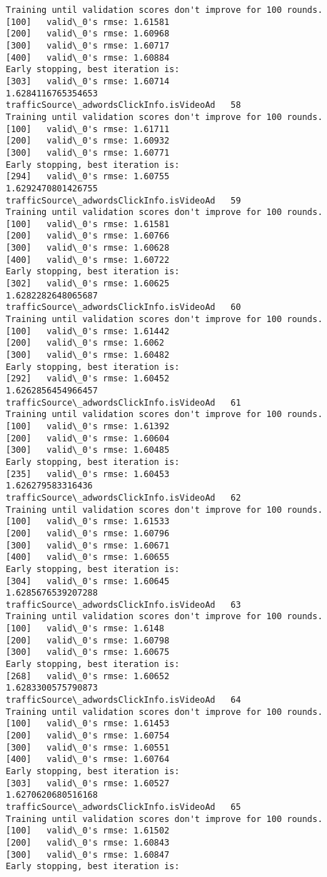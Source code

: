 \documentclass[11pt]{article}
\begin{document}
\begin{Verbatim}[commandchars=\\\{\}]
Training until validation scores don't improve for 100 rounds.
[100]	valid\_0's rmse: 1.61581
[200]	valid\_0's rmse: 1.60968
[300]	valid\_0's rmse: 1.60717
[400]	valid\_0's rmse: 1.60884
Early stopping, best iteration is:
[303]	valid\_0's rmse: 1.60714
1.6284116765354653
trafficSource\_adwordsClickInfo.isVideoAd   58
Training until validation scores don't improve for 100 rounds.
[100]	valid\_0's rmse: 1.61711
[200]	valid\_0's rmse: 1.60932
[300]	valid\_0's rmse: 1.60771
Early stopping, best iteration is:
[294]	valid\_0's rmse: 1.60755
1.6292470801426755
trafficSource\_adwordsClickInfo.isVideoAd   59
Training until validation scores don't improve for 100 rounds.
[100]	valid\_0's rmse: 1.61581
[200]	valid\_0's rmse: 1.60766
[300]	valid\_0's rmse: 1.60628
[400]	valid\_0's rmse: 1.60722
Early stopping, best iteration is:
[302]	valid\_0's rmse: 1.60625
1.6282282648065687
trafficSource\_adwordsClickInfo.isVideoAd   60
Training until validation scores don't improve for 100 rounds.
[100]	valid\_0's rmse: 1.61442
[200]	valid\_0's rmse: 1.6062
[300]	valid\_0's rmse: 1.60482
Early stopping, best iteration is:
[292]	valid\_0's rmse: 1.60452
1.6262856454966457
trafficSource\_adwordsClickInfo.isVideoAd   61
Training until validation scores don't improve for 100 rounds.
[100]	valid\_0's rmse: 1.61392
[200]	valid\_0's rmse: 1.60604
[300]	valid\_0's rmse: 1.60485
Early stopping, best iteration is:
[235]	valid\_0's rmse: 1.60453
1.626279583316436
trafficSource\_adwordsClickInfo.isVideoAd   62
Training until validation scores don't improve for 100 rounds.
[100]	valid\_0's rmse: 1.61533
[200]	valid\_0's rmse: 1.60796
[300]	valid\_0's rmse: 1.60671
[400]	valid\_0's rmse: 1.60655
Early stopping, best iteration is:
[304]	valid\_0's rmse: 1.60645
1.6285676539207288
trafficSource\_adwordsClickInfo.isVideoAd   63
Training until validation scores don't improve for 100 rounds.
[100]	valid\_0's rmse: 1.6148
[200]	valid\_0's rmse: 1.60798
[300]	valid\_0's rmse: 1.60675
Early stopping, best iteration is:
[268]	valid\_0's rmse: 1.60652
1.6283300575790873
trafficSource\_adwordsClickInfo.isVideoAd   64
Training until validation scores don't improve for 100 rounds.
[100]	valid\_0's rmse: 1.61453
[200]	valid\_0's rmse: 1.60754
[300]	valid\_0's rmse: 1.60551
[400]	valid\_0's rmse: 1.60764
Early stopping, best iteration is:
[303]	valid\_0's rmse: 1.60527
1.6270620680516168
trafficSource\_adwordsClickInfo.isVideoAd   65
Training until validation scores don't improve for 100 rounds.
[100]	valid\_0's rmse: 1.61502
[200]	valid\_0's rmse: 1.60843
[300]	valid\_0's rmse: 1.60847
Early stopping, best iteration is:

\end{Verbatim}
\end{document}
